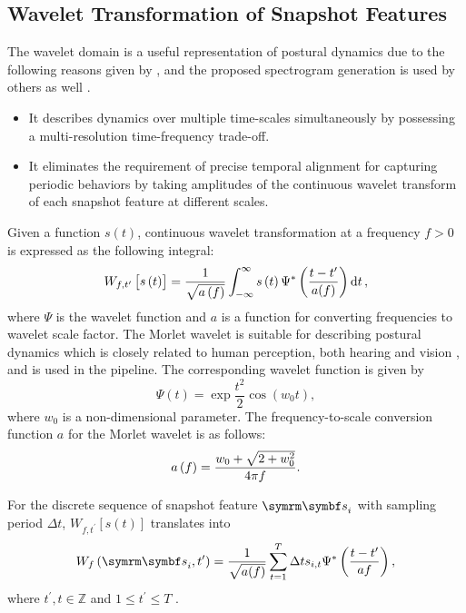 \subsection{Wavelet Transformation of Snapshot Features}
The wavelet domain is a useful representation of postural dynamics due to the following reasons given by \citet{berman_mapping_2014}, and the proposed spectrogram generation is used by others as well \citep{marshall_continuous_2021, todd_systematic_2017}.
\begin{itemize}
	\item It describes dynamics over multiple time-scales simultaneously by possessing a multi-resolution time-frequency trade-off.
	\item It eliminates the requirement of precise temporal alignment for capturing periodic behaviors by taking amplitudes of the continuous wavelet transform of each snapshot feature at different scales.
\end{itemize}
Given a function $s(t)$, continuous wavelet transformation at a frequency $f>0$ is expressed as the following integral:
\begin{equation}
	W_{f,t^{\prime}}\begin{bmatrix}s\left(t\right)\end{bmatrix} = \frac{1}{\sqrt{a\left(f\right)}} \int_{-\infty}^{\infty} s\left(t\right) \Psi^\ast\left(\frac{t - t^{\prime}}{a(f)}\right) \dd{t},
\end{equation}
where $\Psi$ is the wavelet function and $a$ is a function for converting frequencies to wavelet scale factor.
The Morlet wavelet is suitable for describing postural dynamics which is closely related to human perception, both hearing and vision \citep{daugman_uncertainty_1985}, and is used in the pipeline.
The corresponding wavelet function is given by
\begin{equation}
	\Psi(t) = \exp{\frac{t^2}{2}} \cos(w_0t),
\end{equation}
where $w_0$ is a non-dimensional parameter. The frequency-to-scale conversion function $a$ for the Morlet wavelet is as follows:
\begin{equation}
	a\left(f\right) = \frac{w_0 + \sqrt{2+w_0^2}}{4 \pi f}.
\end{equation}

For the discrete sequence of snapshot feature $\V{s}_i$ with sampling period $\Delta t$, $W_{f,t^\prime}[s(t)]$ translates into
\begin{equation}
	\label{eq:wavelet-practical}
	W_f\rbr{\V{s}_i, t^\prime} = \frac{1}{\sqrt{a(f)}} \sum_{t=1}^{T} {\Delta t} s_{i,t} \Psi^\ast\rbr{\frac{t-t^{\prime}}{a{f}}},
\end{equation}
where $t^\prime, t \in \mathbb{Z}$ and $ 1 \leq t^\prime \leq T$ \citep{torrence_practical_1998}.

